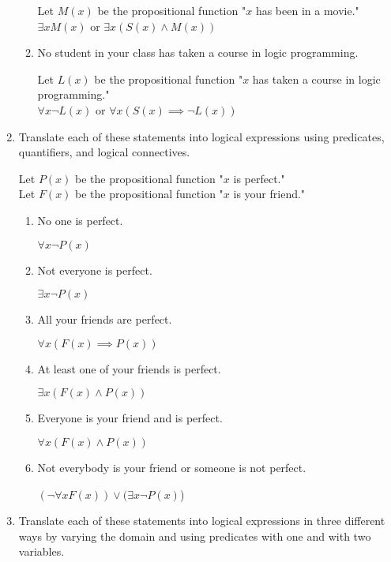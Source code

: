 \documentclass[11pt]{article}
\begin{document}
\begin{enumerate}[label=\textbf{\arabic*.}]
\begin{enumerate}[label=\textbf{\alph*)}]
		Let $M(x)$ be the propositional function "$x$ has been in a movie." \\
		$\exists xM(x)$ or $\exists x(S(x) \land M(x))$
		
		\item No student in your class has taken a course in logic programming.
		
		Let $L(x)$ be the propositional function "$x$ has taken a course in logic programming." \\
		$\forall x\neg L(x)$ or $\forall x(S(x) \implies \neg L(x))$
	\end{enumerate}

	\item Translate each of these statements into logical expressions using predicates, quantifiers, and logical connectives.
	
	Let $P(x)$ be the propositional function "$x$ is perfect." \\
	Let $F(x)$ be the propositional function "$x$ is your friend."
	\begin{enumerate}[label=\textbf{\alph*)}]
		\item No one is perfect.
		
		$\forall x\neg P(x)$
		
		\item Not everyone is perfect.
		
		$\exists x\neg P(x)$
		
		\item All your friends are perfect.
		
		$\forall x(F(x) \implies P(x))$
		
		\item At least one of your friends is perfect.
		
		$\exists x(F(x) \land P(x))$
		
		\item Everyone is your friend and is perfect.
		
		$\forall x(F(x) \land P(x))$
		
		\item Not everybody is your friend or someone is not perfect.
		
		$(\neg\forall xF(x)) \lor (\exists x\neg P(x)$)
	\end{enumerate}

	\item Translate each of these statements into logical expressions in three different ways by varying the domain and using predicates with one and with two variables.
	

\end{enumerate}
\end{document}
